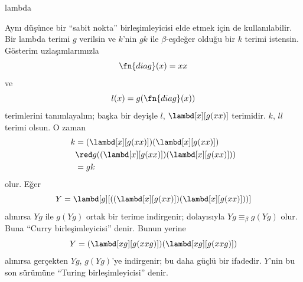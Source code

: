 \begin{tagblock}{lambda}
\begin{digress}
Aynı düşünce bir ``sabit nokta'' birleşimleyicisi elde etmek için de
kullanılabilir. Bir lambda terimi $g$ verilsin ve $k$'nin $gk$ ile
$\beta$-eşdeğer olduğu bir $k$ terimi istensin. Gösterim uzlaşımlarımızla
\[
  \fn{diag}(x)=xx
\]
ve
\[
  l(x)=g(\fn{diag}(x))
\]
terimlerini tanımlayalım; başka bir deyişle $l$, $\lambd[x][g(xx)]$
terimidir. $k$, $ll$ terimi olsun. O zaman
\begin{align*}
  k & = (\lambd[x][g(xx)])(\lambd[x][g(xx)])\\
  & \red g((\lambd[x][g(xx)])(\lambd[x][g(xx)]))\\
  & = gk
\end{align*}
olur. Eğer
\[
  Y=\lambd[g][((\lambd[x][g(xx)])(\lambd[x][g(xx)]))]
\]
alınırsa $Yg$ ile $g(Yg)$ ortak bir terime indirgenir; dolayısıyla
$Yg\equiv_\beta g(Yg)$ olur. Buna ``Curry birleşimleyicisi'' denir. Bunun
yerine
\[
  Y=(\lambd[xg][g(xxg)])(\lambd[xg][g(xxg)])
\]
alınırsa gerçekten $Yg$, $g(Yg)$'ye indirgenir; bu daha güçlü bir ifadedir.
$Y$'nin bu son sürümüne ``Turing birleşimleyicisi'' denir.
\end{digress}
\end{tagblock}

